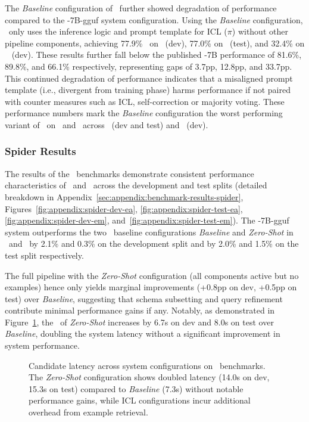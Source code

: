 The \textit{Baseline} configuration of \Natural~further showed degradation of
performance compared to the \OmniSQL-7B-gguf system configuration. Using the
\textit{Baseline} configuration, \Natural~only uses the inference logic and
prompt template for ICL ($\pi$) without other pipeline components, achieving
77.9\% \EA~on \Spider~(dev), 77.0\% on \Spider~(test), and 32.4\% on \Bird~
(dev). These results further fall below the published \OmniSQL-7B performance
of 81.6\%, 89.8\%, and 66.1\% respectively, representing gaps of 3.7pp, 12.8pp,
and 33.7pp. This continued degradation of performance indicates that a
misaligned prompt template (i.e., divergent from training phase) harms
performance if not paired with counter measures such as ICL, self-correction or
majority voting. These performance numbers mark the \textit{Baseline}
configuration the worst performing variant of \Natural~on \EA~and \EM~across
\Spider~(dev and test) and \Bird~(dev).


\subsubsection{Spider Results}

The results of the \Spider~benchmarks demonstrate consistent performance
characteristics of \Natural~and \OmniSQL~across the development and test splits
(detailed breakdown in Appendix~\ref{sec:appendix:benchmark-results-spider},
Figures~\ref{fig:appendix:spider-dev-ea}, \ref{fig:appendix:spider-test-ea},
\ref{fig:appendix:spider-dev-em}, and~\ref{fig:appendix:spider-test-em}).
The \OmniSQL-7B-gguf system outperforms the two \Natural~baseline configurations
\textit{Baseline} and \textit{Zero-Shot} in \EA~and \EM~by 2.1\% and 0.3\% on
the development split and by 2.0\% and 1.5\% on the test split respectively.

The full pipeline with the \textit{Zero-Shot} configuration (all components
active but no examples) hence only yields marginal improvements (+0.8pp on dev,
+0.5pp on test) over \textit{Baseline}, suggesting that schema subsetting and
query refinement contribute minimal performance gains if any. Notably,
as demonstrated in Figure~\ref{fig:eval:candidate-latency}, the \CL~of
\textit{Zero-Shot} increases by 6.7s on dev and 8.0s on test over
\textit{Baseline}, doubling the system latency without a significant
improvement in system performance.

\begin{figure}[htbp]
  \centering
  
  \caption{
    Candidate latency across system configurations on \Spider~benchmarks. The
    \textit{Zero-Shot} configuration shows doubled latency (14.0s on dev, 15.3s
    on test) compared to \textit{Baseline} (7.3s) without notable performance
    gains, while ICL configurations incur additional overhead from example
    retrieval.
  }
  \label{fig:eval:candidate-latency}
\end{figure}

